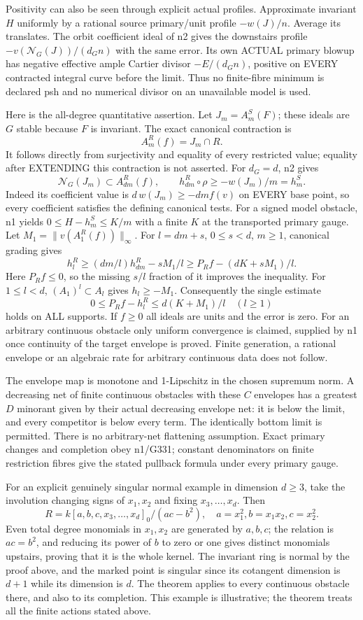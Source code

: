 Positivity can also be seen through explicit actual profiles. Approximate
invariant $H$ uniformly by a rational source primary/unit profile
$-w(J)/n$. Average its translates. The orbit coefficient ideal of n2
gives the downstairs profile $-v(\mathcal N_G(J))/(d_G n)$ with the same
error. Its own ACTUAL primary blowup has negative effective ample
Cartier divisor $-E/(d_G n)$, positive on EVERY contracted integral curve
before the limit. Thus no finite-fibre minimum is declared psh and no
numerical divisor on an unavailable model is used.

Here is the all-degree quantitative assertion. Let $J_m=A_m^S(F)$;
these ideals are $G$ stable because $F$ is invariant. The exact canonical
contraction is
\[
 A_m^R(f)=J_m\cap R.
\]
It follows directly from surjectivity and equality of every restricted
value; equality after EXTENDING this contraction is not asserted.
For $d_G=d$, n2 gives
\[
 \mathcal N_G(J_m)\subset A_{dm}^R(f),\qquad
 h_{dm}^R\circ\rho\ge -w(J_m)/m=h_m^S.
\]
Indeed its coefficient value is $d\,w(J_m)\ge-dm f(v)$ on EVERY base
point, so every coefficient satisfies the defining canonical tests.
For a signed model obstacle, n1 yields $0\le H-h_m^S\le K/m$ with a
finite $K$ at the transported primary gauge. Let
$M_1=\|v(A_1^R(f))\|_\infty$. For $l=dm+s$, $0\le s<d$, $m\ge1$,
canonical grading gives
\[
 h_l^R\ge(dm/l)h_{dm}^R-sM_1/l
       \ge P_Rf-(dK+sM_1)/l.
\]
Here $P_R f\le0$, so the missing $s/l$ fraction of it improves the
inequality. For $1\le l<d$, $(A_1)^l\subset A_l$ gives $h_l\ge-M_1$.
Consequently the single estimate
\[
 0\le P_Rf-h_l^R\le d(K+M_1)/l\quad(l\ge1)
\]
holds on ALL supports. If $f\ge0$ all ideals are units and the error is
zero. For an arbitrary continuous obstacle only uniform convergence is
claimed, supplied by n1 once continuity of the target envelope is proved.
Finite generation, a rational envelope or an algebraic rate for arbitrary
continuous data does not follow.

The envelope map is monotone and 1-Lipschitz in the chosen supremum norm.
A decreasing net of finite continuous obstacles with these $C$ envelopes
has a greatest $D$ minorant given by their actual decreasing envelope net:
it is below the limit, and every competitor is below every term. The
identically bottom limit is permitted. There is no arbitrary-net
flattening assumption. Exact primary changes and completion obey n1/G331;
constant denominators on finite restriction fibres give the stated
pullback formula under every primary gauge.

For an explicit genuinely singular normal example in dimension $d\ge3$,
take the involution changing signs of $x_1,x_2$ and fixing $x_3,\ldots,x_d$.
Then
\[
 R=k[a,b,c,x_3,\ldots,x_d]_0/(ac-b^2),\quad
 a=x_1^2, b=x_1x_2, c=x_2^2.
\]
Even total degree monomials in $x_1,x_2$ are generated by $a,b,c$;
the relation is $ac=b^2$, and reducing its power of $b$ to zero or one
gives distinct monomials upstairs, proving that it is the whole kernel.
The invariant ring is normal by the proof above, and the marked point is
singular since its cotangent dimension is $d+1$ while its dimension is $d$.
The theorem applies to every continuous obstacle there, and also to its
completion. This example is illustrative; the theorem treats all the
finite actions stated above.


